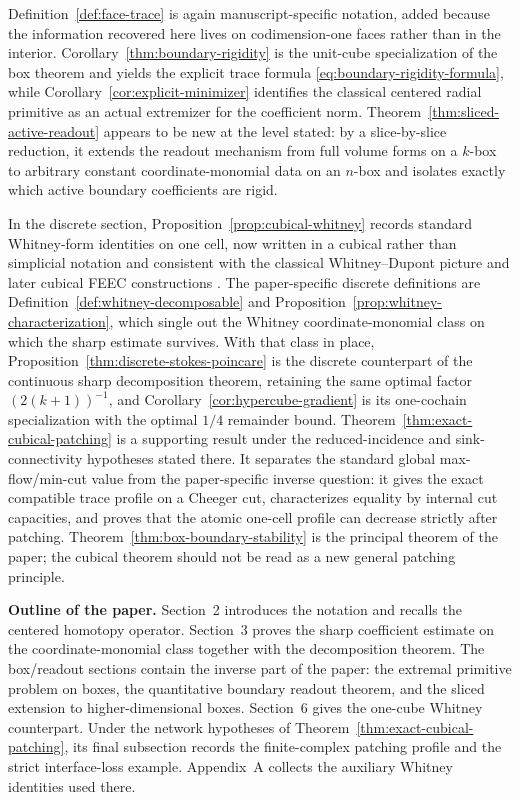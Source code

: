 \documentclass[11pt,letterpaper]{article}
\numberwithin{equation}{section}
\theoremstyle{plain}
\theoremstyle{definition}
\theoremstyle{remark}
\begin{document}
Definition~\ref{def:face-trace} is again manuscript-specific notation, added
because the information recovered here lives on codimension-one faces rather
than in the interior. Corollary~\ref{thm:boundary-rigidity} is the unit-cube
specialization of the box theorem and yields the explicit trace formula
\eqref{eq:boundary-rigidity-formula}, while
Corollary~\ref{cor:explicit-minimizer} identifies the classical centered radial
primitive as an actual extremizer for the coefficient norm. Theorem~\ref{thm:sliced-active-readout}
appears to be new at the level stated: by a
slice-by-slice reduction, it extends the readout mechanism from full volume
forms on a $k$-box to arbitrary constant coordinate-monomial data on an
$n$-box and isolates exactly which active boundary coefficients are rigid.

In the discrete section, Proposition~\ref{prop:cubical-whitney} records
standard Whitney-form identities on one cell, now written in a cubical rather
than simplicial notation and consistent with the classical Whitney--Dupont
picture and later cubical FEEC constructions
\cite{Whitney1957,Dupont1976,ArnoldAwanou2014}. The paper-specific discrete
definitions are Definition~\ref{def:whitney-decomposable} and
Proposition~\ref{prop:whitney-characterization}, which single out the Whitney
coordinate-monomial class on which the sharp estimate survives. With that class
in place, Proposition~\ref{thm:discrete-stokes-poincare} is the discrete
counterpart of the continuous sharp decomposition theorem, retaining the same
optimal factor $(2(k+1))^{-1}$, and Corollary~\ref{cor:hypercube-gradient} is
its one-cochain specialization with the optimal $1/4$ remainder bound.
Theorem~\ref{thm:exact-cubical-patching} is a supporting result under the
reduced-incidence and sink-connectivity hypotheses stated there. It separates
the standard global max-flow/min-cut value from the paper-specific inverse
question: it gives the exact compatible trace profile on a Cheeger cut,
characterizes equality by internal cut capacities, and proves that the atomic
one-cell profile can decrease strictly after patching. Theorem~\ref{thm:box-boundary-stability}
is the principal theorem of the paper; the cubical theorem should not be read
as a new general patching principle.

\medskip
\noindent\textbf{Outline of the paper.}
Section~2 introduces the notation and recalls the centered homotopy operator.
Section~3 proves the sharp coefficient estimate on the coordinate-monomial
class together with the decomposition theorem. The box/readout sections
contain the inverse part of the paper: the extremal primitive problem on
boxes, the quantitative boundary readout theorem, and the sliced extension to
higher-dimensional boxes. Section~6 gives the one-cube Whitney counterpart.
Under the network hypotheses of Theorem~\ref{thm:exact-cubical-patching}, its
final subsection records the finite-complex patching profile and the strict
interface-loss example. Appendix~A collects the auxiliary Whitney identities
used there.
\end{document}
